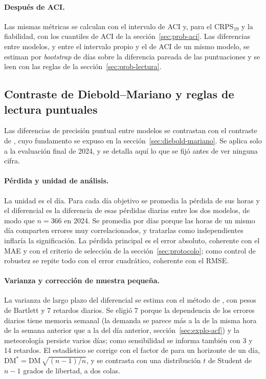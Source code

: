 \paragraph{Después de ACI.} Las mismas métricas se calculan con el intervalo de
ACI y, para el CRPS$_{19}$ y la fiabilidad, con los cuantiles de ACI de la
sección~\ref{sec:prob-aci}. Las diferencias entre modelos, y entre el intervalo
propio y el de ACI de un mismo modelo, se estiman por \textit{bootstrap} de
días sobre la diferencia pareada de las puntuaciones y se leen con las reglas de
la sección~\ref{sec:prob-lectura}.

\subsection{Contraste de Diebold--Mariano y reglas de lectura puntuales}\label{sec:contraste-dm}

Las diferencias de precisión puntual entre modelos se contrastan con el
contraste de \textcite{diebold1995comparing}, cuyo fundamento se expuso en la
sección~\ref{sec:diebold-mariano}. Se aplica solo a la evaluación final de
2024, y se detalla aquí lo que se fijó antes de ver ninguna cifra.

\paragraph{Pérdida y unidad de análisis.} La unidad es el día. Para cada día
objetivo se promedia la pérdida de sus horas y el diferencial es la
diferencia de esas pérdidas diarias entre los dos modelos, de modo que $n = 366$
en 2024. Se promedia por días porque las horas de un mismo día comparten errores
muy correlacionados, y tratarlas como independientes inflaría la
significación. La pérdida principal es el error absoluto, coherente con el MAE y
con el criterio de selección de la sección~\ref{sec:protocolo}; como control de
robustez se repite todo con el error cuadrático, coherente con el RMSE.

\paragraph{Varianza y corrección de muestra pequeña.} La varianza de largo plazo
del diferencial se estima con el método de \textcite{newey1987simple}, con
pesos de Bartlett y 7 retardos diarios. Se eligió 7 porque la dependencia de
los errores diarios tiene memoria semanal (la demanda se parece más a la de la misma hora de la semana anterior que a la
del día anterior, sección~\ref{sec:explo-acf}) y la meteorología
persiste varios días; como sensibilidad se informa también con 3 y 14 retardos.
El estadístico se corrige con el factor de \textcite{harvey1997testing} para un
horizonte de un día, $\mathrm{DM}^{*} = \mathrm{DM}\,\sqrt{(n-1)/n}$, y se
contrasta con una distribución $t$ de Student de $n - 1$ grados de libertad, a
dos colas.

